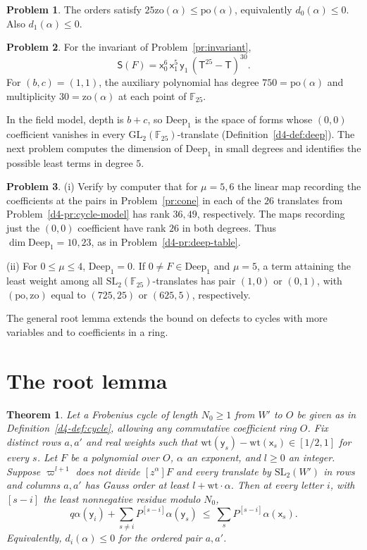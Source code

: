 \documentclass[reqno]{amsart}
\theoremstyle{plain}
\newtheorem{theorem}{Theorem}[section]
\theoremstyle{definition}
\newtheorem{problem}{Problem}[section]
\theoremstyle{remark}
\newcommand{\F}{\mathbb{F}}
\newcommand{\GL}{\mathrm{GL}}
\newcommand{\SL}{\mathrm{SL}}
\newcommand{\xv}{\mathsf{x}}
\newcommand{\yv}{\mathsf{y}}
\newcommand{\Tv}{\mathsf{T}}
\newcommand{\Sv}{\mathsf{S}}
\newcommand{\wt}{\mathrm{wt}}
\newcommand{\zo}{\mathrm{zo}}
\newcommand{\po}{\mathrm{po}}
\newcommand{\Deep}{\mathrm{Deep}}
\begin{document}
\begin{problem}\label{pr:root-model}
The orders satisfy \(25\zo(\alpha)\le\po(\alpha)\), equivalently \(d_0(\alpha)\le0\).  Also \(d_1(\alpha)\le0\).
\end{problem}

\begin{problem}\label{pr:aux-invariant}
For the invariant of Problem~\ref{pr:invariant},
\[
  \Sv(F)=\mathsf{x}_0^6\,\mathsf{x}_1^5\,\mathsf{y}_1\,(\Tv^{25}-\Tv)^{30}.
\]
For \((b,c)=(1,1)\), the auxiliary polynomial has degree \(750=\po(\alpha)\) and multiplicity \(30=\zo(\alpha)\) at each point of \(\F_{25}\).
\end{problem}

In the field model, depth is \(b+c\), so \(\Deep_1\) is the space of forms whose \((0,0)\) coefficient vanishes in every \(\GL_2(\F_{25})\)-translate (Definition~\ref{d4-def:deep}).  The next problem computes the dimension of \(\Deep_1\) in small degrees and identifies the possible least terms in degree \(5\).

\begin{problem}\label{pr:deep-ranks}
(i) Verify by computer that for \(\mu=5,6\) the linear map recording the coefficients at the pairs in Problem~\ref{pr:cone} in each of the \(26\) translates from Problem~\ref{d4-pr:cycle-model} has rank \(36,49\), respectively.  The maps recording just the \((0,0)\) coefficient have rank \(26\) in both degrees.  Thus \(\dim\Deep_1=10,23\), as in Problem~\ref{d4-pr:deep-table}.

(ii) For \(0\le\mu\le4\), \(\Deep_1=0\).  If \(0\ne F\in\Deep_1\) and \(\mu=5\), a term attaining the least weight among all \(\SL_2(\F_{25})\)-translates has pair \((1,0)\) or \((0,1)\), with \((\po,\zo)\) equal to \((725,25)\) or \((625,5)\), respectively.
\end{problem}

The general root lemma extends the bound on defects to cycles with more variables and to coefficients in a ring.

\section{The root lemma}\label{sec:root}

\begin{theorem}\label{thm:root}
Let a Frobenius cycle of length \(N_0\ge1\) from \(W'\) to \(O\) be given as in Definition~\ref{d4-def:cycle}, allowing any commutative coefficient ring \(O\).  Fix distinct rows \(a,a'\) and real weights such that \(\wt(\yv_s)-\wt(\xv_s)\in[1/2,1]\) for every \(s\).  Let \(F\) be a polynomial over \(O\), \(\alpha\) an exponent, and \(l\ge0\) an integer.  Suppose \(\varpi^{l+1}\) does not divide \([z^\alpha]F\) and every translate by \(\SL_2(W')\) in rows and columns \(a,a'\) has Gauss order at least \(l+\wt\cdot\alpha\).  Then at every letter \(i\), with \([s-i]\) the least nonnegative residue modulo \(N_0\),
\[
  q\alpha(\yv_i)+\sum_{s\ne i}P^{[s-i]}\alpha(\yv_s)
  \ \le\ \sum_s P^{[s-i]}\alpha(\xv_s).
\]
Equivalently, \(d_i(\alpha)\le0\) for the ordered pair \(a,a'\).
\end{theorem}
\end{document}

